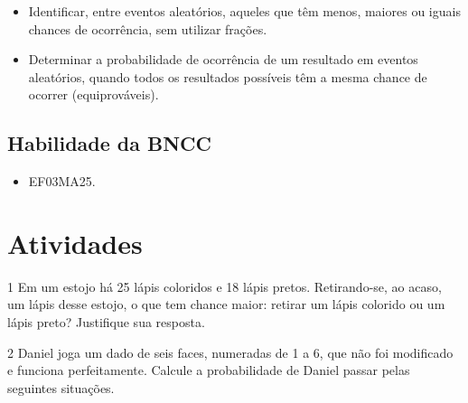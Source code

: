 \begin{itemize}
\item Identificar, entre eventos aleatórios, aqueles que têm menos, maiores ou
iguais chances de ocorrência, sem utilizar frações.

\item Determinar a probabilidade de ocorrência de um resultado em eventos
aleatórios, quando todos os resultados possíveis têm a mesma chance de
ocorrer (equiprováveis).
\end{itemize}

\subsection{Habilidade da BNCC}

\begin{itemize}
  \item 
 EF03MA25.
\end{itemize}


\pagebreak 

\section*{Atividades}

\num{1} Em um estojo há 25 lápis coloridos e 18 lápis pretos. Retirando-se, ao
acaso, um lápis desse estojo, o que tem chance maior: retirar um lápis
colorido ou um lápis preto? Justifique sua resposta.

\num{2} Daniel joga um dado de seis faces, numeradas de 1 a 6, que não foi modificado e funciona perfeitamente. Calcule a probabilidade de Daniel passar pelas seguintes situações.

